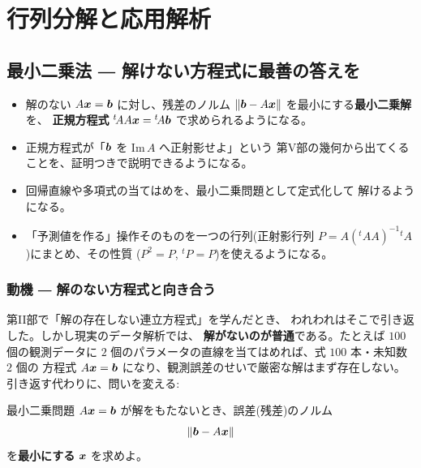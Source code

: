 \part{行列分解と応用解析}

\chapter{最小二乗法 ― 解けない方程式に最善の答えを}\label{chap:lsq}

\begin{goal}
\begin{itemize}
\item 解のない $A\bm{x} = \bm{b}$ に対し、残差のノルム
$\|\bm{b} - A\bm{x}\|$ を最小にする\textbf{最小二乗解}を、
\textbf{正規方程式} ${}^t\!AA\bm{x} = {}^t\!A\bm{b}$ で求められるようになる。
\item 正規方程式が「$\bm{b}$ を $\mathrm{Im}\,A$ へ正射影せよ」という
第V部の幾何から出てくることを、証明つきで説明できるようになる。
\item 回帰直線や多項式の当てはめを、最小二乗問題として定式化して
解けるようになる。
\item 「予測値を作る」操作そのものを一つの行列(正射影行列
$P = A({}^t\!AA)^{-1}{}^t\!A$)にまとめ、その性質
($P^2 = P$, ${}^t\!P = P$)を使えるようになる。
\end{itemize}
\end{goal}

\section{動機 ― 解のない方程式と向き合う}

第II部で「解の存在しない連立方程式」を学んだとき、
われわれはそこで引き返した。しかし現実のデータ解析では、
\textbf{解がないのが普通}である。たとえば $100$ 個の観測データに
$2$ 個のパラメータの直線を当てはめれば、式 $100$ 本・未知数 $2$ 個の
方程式 $A\bm{x} = \bm{b}$ になり、観測誤差のせいで厳密な解はまず存在しない。
引き返す代わりに、問いを変える:

\begin{itembox}[l]{最小二乗問題}
$A\bm{x} = \bm{b}$ が解をもたないとき、誤差(残差)のノルム
\[
\| \bm{b} - A\bm{x} \|
\]
を\textbf{最小にする} $\bm{x}$ を求めよ。
\end{itembox}

